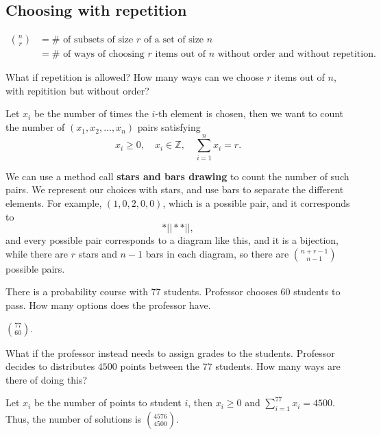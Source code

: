 \subsection{Choosing with repetition}
\begin{prev}
    \begin{align*}
        \binom{n}{r} &= \# \text{ of subsets of size } r \text{ of a set of size }n \\
        &= \# \text{ of ways of choosing } r \text{ items out of } n \text{ without order and without repetition}.     
    \end{align*}
\end{prev}

\begin{question}
    What if repetition is allowed? How many ways can we choose \(r\) items out of \(n\), with repitition but without order?  
\end{question}

Let \(x_i\) be the number of times the \(i\)-th element is chosen, then we want to count the number of \((x_1, x_2, \dots , x_n)\) pairs satisfying 
\[
    x_i \ge 0, \quad x_i \in \mathbb{Z}, \quad \sum_{i=1}^n x_i = r. 
\]   

We can use a method call \textbf{stars and bars drawing} to count the number of such pairs. We represent our choices with stars, and use bars to separate the different elements. For example, \((1,0,2,0,0)\), which is a possible pair, and it corresponds to 
\[
    * || ** | |,
\]   
and every possible pair corresponds to a diagram like this, and it is a bijection, while there are \(r\) stars and \(n - 1\) bars in each diagram, so there are \(\binom{n + r - 1}{n - 1}\) possible pairs.

\begin{eg}
    There is a probability course with \(77\) students. Professor chooses \(60\) students to pass. How many options does the professor have.  
\end{eg}
\begin{answer}
    \(\binom{77}{60}\). 
\end{answer}

\begin{eg}
    What if the professor instead needs to assign grades to the students. Professor decides to distributes \(4500\) points between the \(77\) students. How many ways are there of doing this?  
\end{eg}
\begin{explanation}
    Let \(x_i\) be the number of points to student \(i\), then \(x_i \ge 0\) and \(\sum_{i=1}^{77} x_i = 4500 \). Thus, the number of solutions is \(\binom{4576}{4500}\).     
\end{explanation}

